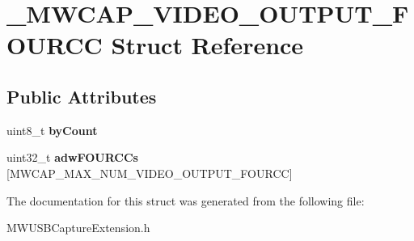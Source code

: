 \hypertarget{struct__MWCAP__VIDEO__OUTPUT__FOURCC}{\section{\-\_\-\-M\-W\-C\-A\-P\-\_\-\-V\-I\-D\-E\-O\-\_\-\-O\-U\-T\-P\-U\-T\-\_\-\-F\-O\-U\-R\-C\-C Struct Reference}
\label{struct__MWCAP__VIDEO__OUTPUT__FOURCC}
}
\subsection*{Public Attributes}
\begin{DoxyCompactItemize}
\item 
\hypertarget{struct__MWCAP__VIDEO__OUTPUT__FOURCC_a519d16602e3191777d4ff30177f32a9d}{uint8\-\_\-t {\bfseries by\-Count}}\label{struct__MWCAP__VIDEO__OUTPUT__FOURCC_a519d16602e3191777d4ff30177f32a9d}

\item 
\hypertarget{struct__MWCAP__VIDEO__OUTPUT__FOURCC_af5a4b133a5134b2b04a004a977898b5a}{uint32\-\_\-t {\bfseries adw\-F\-O\-U\-R\-C\-Cs} \mbox{[}M\-W\-C\-A\-P\-\_\-\-M\-A\-X\-\_\-\-N\-U\-M\-\_\-\-V\-I\-D\-E\-O\-\_\-\-O\-U\-T\-P\-U\-T\-\_\-\-F\-O\-U\-R\-C\-C\mbox{]}}\label{struct__MWCAP__VIDEO__OUTPUT__FOURCC_af5a4b133a5134b2b04a004a977898b5a}

\end{DoxyCompactItemize}


The documentation for this struct was generated from the following file\-:\begin{DoxyCompactItemize}
\item 
M\-W\-U\-S\-B\-Capture\-Extension.\-h\end{DoxyCompactItemize}
